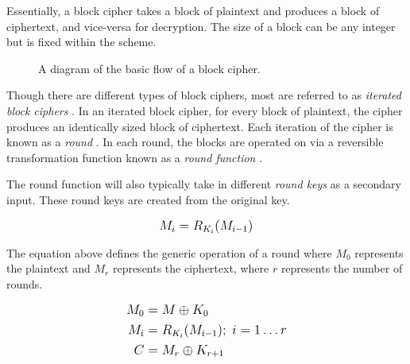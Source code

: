 Essentially, a block cipher takes a block of plaintext and produces a block of ciphertext, and vice-versa for decryption. 
The size of a block can be any integer but is fixed within the scheme. 

\begin{figure}[H]
    \centering
    \caption{A diagram of the basic flow of a block cipher.}
\end{figure}

Though there are different types of block ciphers, most are referred to as \textit{iterated block ciphers} \cite{wiki:block_cipher}. 
In an iterated block cipher, for every block of plaintext, the cipher produces an identically sized block of ciphertext. Each iteration of the cipher is 
known as a \textit{round} \cite{wiki:block_cipher}. In each round, the blocks are operated on via a reversible transformation function 
known as a \textit{round function} \cite{wiki:block_cipher}.

The round function will also typically take in different \textit{round keys} as a secondary input. These round keys are created from the original key. 

\begin{align*}
    \mathlarger{M_i = R_{K_i}(M_{i-1})}
\end{align*}

The equation above defines the generic operation of a round where $M_0$ represents the plaintext and $M_r$ represents the ciphertext, where 
$r$ represents the number of rounds.

\begin{align*}
    \mathlarger{M_0\;} & \mathlarger{= M \oplus K_0} \\
    \mathlarger{M_i\;} & \mathlarger{= R_{K_i}(M_{i - 1});\; i=1 \ldots r} \\
    \mathlarger{C\;} & \mathlarger{= M_r \oplus K_{r + 1}} \\
\end{align*}

